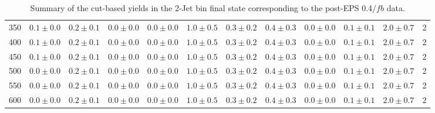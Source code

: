 \begin{table}[!hb]
{\begin{center}
\begin{tabular}{l c c c c c c c c c c c }
350 & $0.1\pm0.0$ & $0.2\pm0.1$ & $0.0\pm0.0$ & $0.0\pm0.0$ & $1.0\pm0.5$ & $0.3\pm0.2$ & $0.4\pm0.3$ & $0.0\pm0.0$ & $0.1\pm0.1$ & $2.0\pm0.7$ & 2 \\
400 & $0.1\pm0.0$ & $0.2\pm0.1$ & $0.0\pm0.0$ & $0.0\pm0.0$ & $1.0\pm0.5$ & $0.3\pm0.2$ & $0.4\pm0.3$ & $0.0\pm0.0$ & $0.1\pm0.1$ & $2.0\pm0.7$ & 2 \\
450 & $0.1\pm0.0$ & $0.2\pm0.1$ & $0.0\pm0.0$ & $0.0\pm0.0$ & $1.0\pm0.5$ & $0.3\pm0.2$ & $0.4\pm0.3$ & $0.0\pm0.0$ & $0.1\pm0.1$ & $2.0\pm0.7$ & 2 \\
500 & $0.0\pm0.0$ & $0.2\pm0.1$ & $0.0\pm0.0$ & $0.0\pm0.0$ & $1.0\pm0.5$ & $0.3\pm0.2$ & $0.4\pm0.3$ & $0.0\pm0.0$ & $0.1\pm0.1$ & $2.0\pm0.7$ & 2 \\
550 & $0.0\pm0.0$ & $0.2\pm0.1$ & $0.0\pm0.0$ & $0.0\pm0.0$ & $1.0\pm0.5$ & $0.3\pm0.2$ & $0.4\pm0.3$ & $0.0\pm0.0$ & $0.1\pm0.1$ & $2.0\pm0.7$ & 2 \\
600 & $0.0\pm0.0$ & $0.2\pm0.1$ & $0.0\pm0.0$ & $0.0\pm0.0$ & $1.0\pm0.5$ & $0.3\pm0.2$ & $0.4\pm0.3$ & $0.0\pm0.0$ & $0.1\pm0.1$ & $2.0\pm0.7$ & 2 \\
\hline
\end{tabular}
\end{center}
}
\caption{Summary of the cut-based yields in the 2-Jet bin final state corresponding to the post-EPS 0.4$/fb$ data.}
\end{table}
